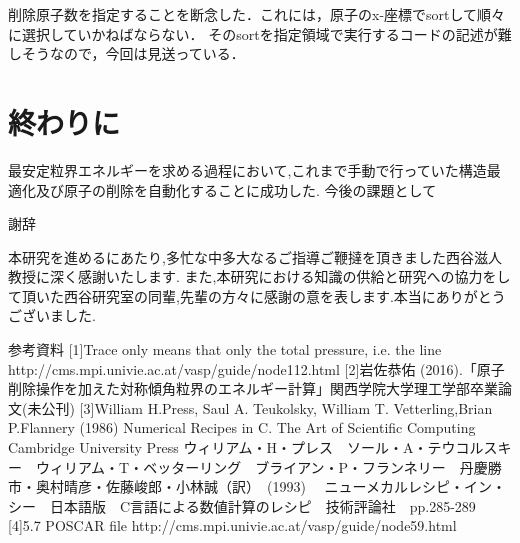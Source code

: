 \documentclass[11pt,dvipdfmx]{jsarticle}
\begin{document}
削除原子数を指定することを断念した．これには，原子のx-座標でsortして順々に選択していかねばならない．
そのsortを指定領域で実行するコードの記述が難しそうなので，今回は見送っている．

    \section{終わりに}\label{ux7d42ux308fux308aux306b}

最安定粒界エネルギーを求める過程において,これまで手動で行っていた構造最適化及び原子の削除を自動化することに成功した.
今後の課題として

    謝辞

本研究を進めるにあたり,多忙な中多大なるご指導ご鞭撻を頂きました西谷滋人教授に深く感謝いたします.
また,本研究における知識の供給と研究への協力をして頂いた西谷研究室の同輩,先輩の方々に感謝の意を表します.本当にありがとうございました.

    参考資料 {[}1{]}Trace only means that only the total pressure, i.e. the
line http://cms.mpi.univie.ac.at/vasp/guide/node112.html {[}2{]}岩佐恭佑
(2016).「原子削除操作を加えた対称傾角粒界のエネルギー計算」関西学院大学理工学部卒業論文(未公刊)
{[}3{]}William H.Press, Saul A. Teukolsky, William T. Vetterling,Brian
P.Flannery (1986) Numerical Recipes in C. The Art of Scientific
Computing Cambridge University Press
ウィリアム・H・プレス　ソール・A・テウコルスキー　ウィリアム・T・ベッターリング　ブライアン・P・フランネリー　丹慶勝市・奥村晴彦・佐藤峻郎・小林誠（訳）　(1993)　
ニューメカルレシピ・イン・シー　日本語版　C言語による数値計算のレシピ　技術評論社　pp.285-289
{[}4{]}5.7 POSCAR file
http://cms.mpi.univie.ac.at/vasp/guide/node59.html


    
    
    
    
\end{document}
